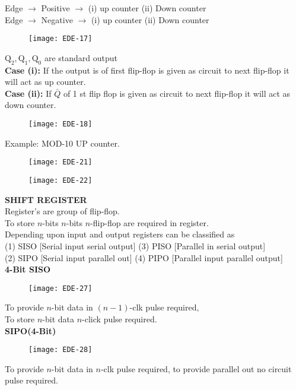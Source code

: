 \begin{enumerate}
 	Edge $\rightarrow$ Positive $\rightarrow$ (i) up counter (ii) Down counter \\
 	Edge $\rightarrow$ Negative $\rightarrow$ (i) up counter (ii) Down counter
 	\begin{figure}[H]
 		\centering
 		\texttt{[image: EDE-17]}
 	\end{figure}
 	$\mathrm{Q}_{2}, \mathrm{Q}_{1}, \mathrm{Q}_{0}$ are standard output\\
 	\textbf{Case (i):} If the output is of first flip-flop is given as circuit to next flip-flop it will act as up counter.\\
 	\textbf{Case (ii):} If $\bar{Q}$ of 1 st flip flop is given as circuit to next flip-flop it will act as down counter.
 	\begin{figure}[H]
 	\centering
 	\texttt{[image: 	EDE-18]}
 \end{figure}
	Example: MOD-10 UP counter.
	\begin{figure}[H]
		\centering
		\texttt{[image: EDE-21]}
	\end{figure}
\begin{figure}[H]
	\centering
	\texttt{[image: EDE-22]}
\end{figure}
\textbf{SHIFT REGISTER}\\
Register's are group of flip-flop.\\
To store $n$-bits $n$-bits $n$-flip-flop are required in register. \\
Depending upon input and output registers can be classified as\\
(1) SISO [Serial input serial output]\quad
(3) PISO [Parallel in serial output]\\
(2) SIPO [Serial input parallel out]\quad
(4) PIPO [Parallel input parallel output]\\
\textbf { 4-Bit SISO }
\begin{figure}[H]
	\centering
	\texttt{[image: EDE-27]}
\end{figure}
To provide $n$-bit data in $(n-1)$-clk pulse required, \\
To store $n$-bit data $n$-click pulse required.\\
\textbf{SIPO(4-Bit)}
\begin{figure}[H]
	\centering
	\texttt{[image: EDE-28]}
\end{figure}
To provide $n$-bit data in $n$-clk pulse required, to provide parallel out no circuit pulse required.\\

\end{enumerate}
